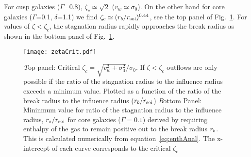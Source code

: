 For cusp galaxies ($\Gamma$=0.8), $\zeta_c\simeq \sqrt 2$
($v_w\simeq\sigma_0$).  On the other hand for core galaxies
($\Gamma$=0.1, $\delta$=1.1) we find $\zeta_c\simeq
(r_b/r_{\rm soi})^{0.44}$, see the top panel of Fig.~\ref{fig:zetaCrit}. For
values of $\zeta<\zeta_c$, the stagnation radius rapidly approaches
the break radius as shown in the bottom panel of
Fig.~\ref{fig:zetaCrit}.



\begin{figure}
\texttt{[image: zetaCrit.pdf]}
\caption{\label{fig:zetaCrit} {\emph Top panel:} Critical
  $\zeta_c=\sqrt{v_w^2+\sigma_0^2}/\sigma_0$. If $\zeta<\zeta_c$ outflows are
  only possible if the ratio of the stagnation radius to the influence
  radius exceeds a minimum value. Plotted as a function of the ratio
  of the break radius to the influence radius ($r_b/r_{\rm soi}$) {\emph Bottom
    Panel:} Mininmum value for ratio of the stagnation radius to the
  influence radius, $r_s/r_{\rm soi}$ for core galaxies ($\Gamma=0.1$)
  derived by requiring enthalpy of the gas to remain positive out to
  the break radius $r_b$. This is calculated numerically from
  equation~\eqref{eq:enthAnal}. The x-intercept of each curve
  corresponds to the critical $\zeta_c$}
\end{figure}


